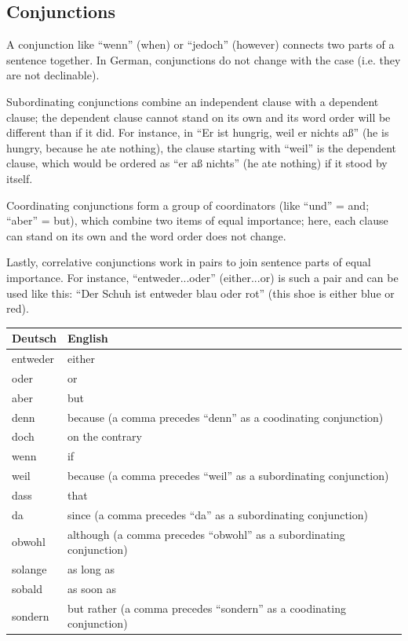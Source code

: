 \pagebreak
\subsection{Conjunctions}

A conjunction like ``wenn'' (when) or ``jedoch'' (however) connects two parts of a sentence together. In German, conjunctions do not change with the case (i.e. they are not declinable).

Subordinating conjunctions combine an independent clause with a dependent clause; the dependent clause cannot stand on its own and its word order will be different than if it did. For instance, in ``Er ist hungrig, weil er nichts aß'' (he is hungry, because he ate nothing), the clause starting with ``weil'' is the dependent clause, which would be ordered as ``er aß nichts'' (he ate nothing) if it stood by itself.

Coordinating conjunctions form a group of coordinators (like ``und'' = and; ``aber'' = but), which combine two items of equal importance; here, each clause can stand on its own and the word order does not change.

Lastly, correlative conjunctions work in pairs to join sentence parts of equal importance. For instance, ``entweder...oder'' (either...or) is such a pair and can be used like this: ``Der Schuh ist entweder blau oder rot'' (this shoe is either blue or red).

\begin{center}\begin{tabular}{l|l}
  \textbf{Deutsch} & \textbf{English} \\
	\hline
	entweder & either \\
	oder & or \\
	aber & but \\
	denn & because (a comma precedes ``denn'' as a coodinating conjunction) \\
	doch & on the contrary \\
	wenn & if \\
	weil & because (a comma precedes ``weil'' as a subordinating conjunction) \\
	dass & that \\
	da & since (a comma precedes ``da'' as a subordinating conjunction) \\
	obwohl & although (a comma precedes ``obwohl'' as a subordinating conjunction) \\
	solange & as long as \\
	sobald & as soon as \\
	sondern & but rather (a comma precedes ``sondern'' as a coodinating conjunction) \\
\end{tabular}\end{center}


